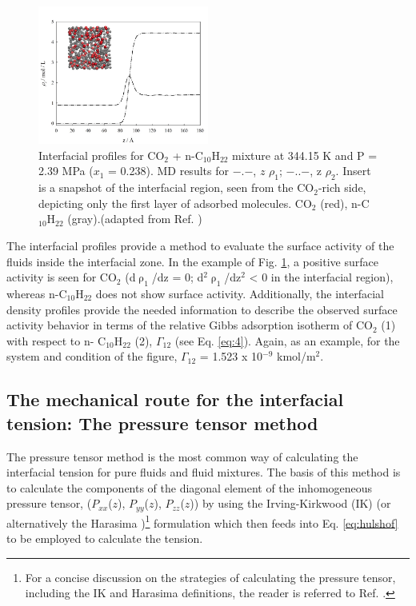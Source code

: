 \documentclass[9pt,bestpractices]{livecoms}
\begin{document}
\begin{figure}
\includegraphics[width=0.5\textwidth]{gfx/image54.jpeg}
\caption{Interfacial profiles for CO$_{2}$ + n-C$_{10}$H$_{22}$ mixture at 344.15 K and P = 2.39 MPa ($x_{1}$ = 0.238). MD results for ${-}$.${-}$, $z$ \textendash{} ${\rho}_{1}$; ${-}$..${-}$, z\textendash{} ${\rho}_{2}$. Insert is a snapshot of the interfacial region, seen from the CO$_{2}$-rich side, depicting only the first layer of adsorbed molecules. CO$_{2}$ (red), n-C$_{10}$H$_{22}$ (gray).(adapted from Ref. \citep{mejia2014a})}
\label{fig:9}
\end{figure}

The interfacial profiles provide a method to evaluate the surface activity of
the fluids inside the interfacial zone. In the example of Fig. \ref{fig:9}, a positive
surface activity is seen for CO$_{2}$ (d${\uprho}_{1}$/dz = 0;
d$^{2}{\uprho}_{1}$/dz$^{2}$ {\textless} 0 in the interfacial region),
whereas n-C$_{10}$H$_{22}$ does not show surface activity. Additionally, the
interfacial density profiles provide the needed information to describe the
observed surface activity behavior in terms of the relative Gibbs adsorption
isotherm of CO$_{2}$ (1) with respect to n- C$_{10}$H$_{22}$ (2),
${\Gamma}_{12}$ (see Eq. \ref{eq:4}). Again, as an example, for the system and
condition of the figure, ${\Gamma}_{12}$ = 1.523 x 10$^{-9}$
kmol/m$^{2}$\citep{mejia2014a}.

\subsection{The mechanical route for the interfacial tension: The pressure tensor method}

The pressure tensor method is the most common way of calculating the
interfacial tension for pure fluids and fluid mixtures. The
basis of this method is to calculate the components of the diagonal element of
the inhomogeneous pressure tensor, ($P_{xx}$($z$),
$P_{yy}$($z$), $P_{zz}$($z$)) by using the
Irving-Kirkwood (IK) \citep{irving1950}
(or alternatively the Harasima \citep{harasima1957})\footnote{For
a concise discussion on the strategies of calculating the pressure tensor,
including the IK and Harasima definitions, the reader is referred to Ref. \citep{long2013}.
}
formulation which
then feeds into Eq. \ref{eq:hulshof} to be employed to calculate the tension. 
\end{document}
